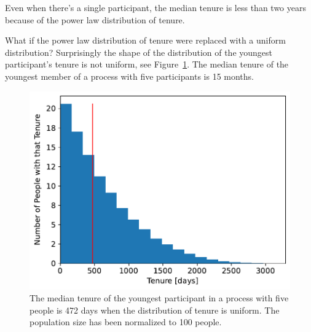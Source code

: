 Even when there's a single participant, the median tenure is less than two years because of the power law distribution of tenure.

What if the power law distribution of tenure were replaced with a uniform distribution?
Surprisingly the shape of the distribution of the youngest participant's tenure is not uniform, see Figure~\ref{fig:tenure-uniform-5-participants}. The median tenure of the youngest member of a process with five participants is 15 months. 

\begin{figure}[!htb]  %
    \centering
    \iftoggle{narrowpage}{\newcommand\imgwidth{1}}{\newcommand\imgwidth{0.7}}
    \includegraphics[width=\imgwidth\textwidth]{images/tenure_uniform_distribution_with_max_tenure10_and_5_participants_median472.pdf}
    \caption{The median tenure of the youngest participant
 in a process with five people is 472 days when the distribution of tenure is uniform. The population size has been normalized to 100 people.}
    \label{fig:tenure-uniform-5-participants}
\end{figure}



\FloatBarrier